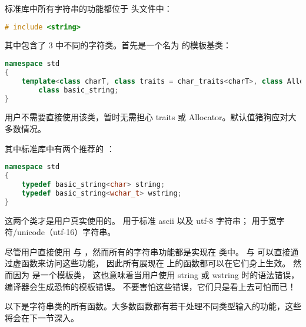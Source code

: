 \documentclass[../../LearnCpp.tex]{subfiles}
\begin{document}
标准库中所有字符串的功能都位于  头文件中：

\begin{lstlisting}[language=C++]
# include <string>
\end{lstlisting}

其中包含了 3 中不同的字符类。首先是一个名为  的模板基类：

\begin{lstlisting}[language=C++]
namespace std
{
    template<class charT, class traits = char_traits<charT>, class Allocator = allocator<charT> >
        class basic_string;
}
\end{lstlisting}

用户不需要直接使用该类，暂时无需担心 traits 或 Allocator。默认值猪狗应对大多数情况。

其中标准库中有两个推荐的 ：

\begin{lstlisting}[language=C++]
namespace std
{
    typedef basic_string<char> string;
    typedef basic_string<wchar_t> wstring;
}
\end{lstlisting}

这两个类才是用户真实使用的。 用于标准 ascii 以及 utf-8 字符串；
 用于宽字符/unicode（utf-16）字符串。

尽管用户直接使用  与 ，然而所有的字符串功能都是实现在  类中。
 与  可以直接通过虚函数来访问这些功能，
因此所有展现在  上的函数都可以在它们身上生效。
然而因为  是一个模板类，
这也意味着当用户使用 string 或 wstring 时的语法错误，编译器会生成恐怖的模板错误。
不要害怕这些错误，它们只是看上去可怕而已！

以下是字符串类的所有函数。大多数函数都有若干处理不同类型输入的功能，这些将会在下一节深入。
\end{document}

